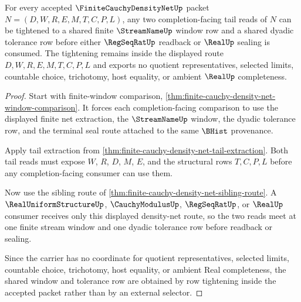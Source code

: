\begin{theorem}
\label{thm:finite-cauchy-density-net-diagonal-tightening}
For every accepted $\FiniteCauchyDensityNetUp$ packet $N=(D,W,R,E,M,T,C,P,L)$, any two completion-facing tail reads of $N$ can be tightened to a shared finite $\StreamNameUp$ window row and a shared dyadic tolerance row before either $\RegSeqRatUp$ readback or $\RealUp$ sealing is consumed. The tightening remains inside the displayed route $D,W,R,E,M,T,C,P,L$ and exports no quotient representatives, selected limits, countable choice, trichotomy, host equality, or ambient $\RealUp$ completeness.
\end{theorem}
\begin{proof}
Start with finite-window comparison, \autoref{thm:finite-cauchy-density-net-window-comparison}. It forces each completion-facing comparison to use the displayed finite net extraction, the $\StreamNameUp$ window, the dyadic tolerance row, and the terminal seal route attached to the same $\BHist$ provenance.

Apply tail extraction from \autoref{thm:finite-cauchy-density-net-tail-extraction}. Both tail reads must expose $W$, $R$, $D$, $M$, $E$, and the structural rows $T,C,P,L$ before any completion-facing consumer can use them.

Now use the sibling route of \autoref{thm:finite-cauchy-density-net-sibling-route}. A $\RealUniformStructureUp$, $\CauchyModulusUp$, $\RegSeqRatUp$, or $\RealUp$ consumer receives only this displayed density-net route, so the two reads meet at one finite stream window and one dyadic tolerance row before readback or sealing.

Since the carrier has no coordinate for quotient representatives, selected limits, countable choice, trichotomy, host equality, or ambient Real completeness, the shared window and tolerance row are obtained by row tightening inside the accepted packet rather than by an external selector.
\end{proof}

